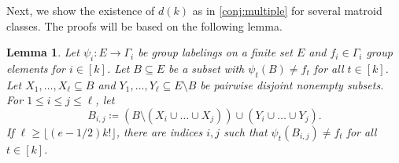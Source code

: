 \documentclass{article}
\newtheorem{lemma}[theorem]{Lemma}
\theoremstyle{definition}
\newcommand{\cups}{\cup\dots\cup}
\begin{document}
Next, we show the existence of $d(k)$ as in \cref{conj:multiple} for several matroid classes. The proofs will be based on the following lemma.

\begin{lemma} \label{lem:multiple}
Let $\psi_i\colon E \to \Gamma_i$ be group labelings on a finite set $E$ and $f_i \in \Gamma_i$ group elements for $i \in [k]$. Let $B \subseteq E$ be a subset with $\psi_t(B) \ne f_t$ for all $t \in [k]$.
Let $X_1, \dots, X_\ell \subseteq B$ and $Y_1, \dots, Y_\ell \subseteq E \setminus B$ be pairwise disjoint nonempty subsets. For $1 \le i \le j \le \ell$, let \[B_{i,j} \coloneqq (B\setminus (X_i \cups X_j)) \cup (Y_i \cups Y_j).\]
If $\ell \ge \lfloor (e-1/2) k!\rfloor$, there are indices $i, j$ such that $\psi_t(B_{i,j}) \ne f_t$ for all $t \in [k]$. 
\end{lemma}
\end{document}
